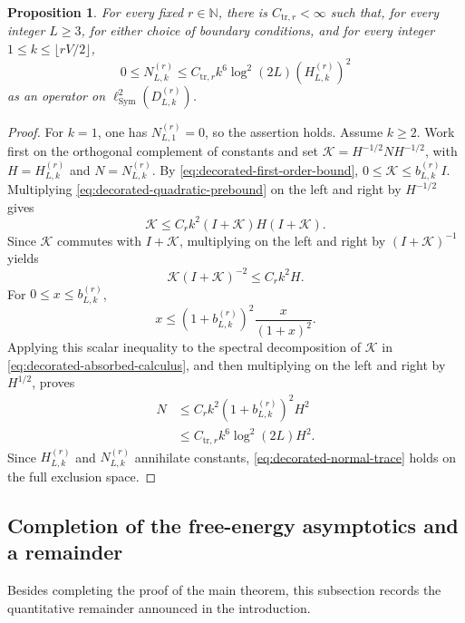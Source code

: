 \documentclass[11pt]{article}
\numberwithin{equation}{section}
\newtheorem{proposition}[theorem]{Proposition}
\theoremstyle{remark}
\newcommand{\1}{\mathbf 1}
\begin{document}
\begin{proposition}
\label{prop:decorated-normal-trace}
For every fixed \(r\in\mathbb N\), there is \(C_{\mathrm{tr},r}<\infty\)
such that, for every integer \(L\geq3\), for either choice of boundary
conditions, and for every integer
\(1\leq k\leq\lfloor rV/2\rfloor\),
\begin{equation}
 0\leq N_{L,k}^{(r)}
 \leq C_{\mathrm{tr},r}k^6\log^2(2L)
 (H_{L,k}^{(r)})^2
 \label{eq:decorated-normal-trace}
\end{equation}
as an operator on \(\ell^2_{\mathrm{Sym}}(D_{L,k}^{(r)})\).
\end{proposition}

\begin{proof}
For \(k=1\), one has \(N_{L,1}^{(r)}=0\), so the assertion holds.  Assume
\(k\geq2\).
Work first on the orthogonal complement of constants and set
\(\mathcal K=H^{-1/2}NH^{-1/2}\), with
\(H=H_{L,k}^{(r)}\) and \(N=N_{L,k}^{(r)}\).  By
\eqref{eq:decorated-first-order-bound},
\(0\leq\mathcal K\leq b_{L,k}^{(r)}I\).  Multiplying
\eqref{eq:decorated-quadratic-prebound} on the left and right by
\(H^{-1/2}\) gives
\[
 \mathcal K\leq C_rk^2(I+\mathcal K)H(I+\mathcal K).
\]
Since \(\mathcal K\) commutes with \(I+\mathcal K\), multiplying on the
left and right by \((I+\mathcal K)^{-1}\) yields
\begin{equation}
 \mathcal K(I+\mathcal K)^{-2}\leq C_rk^2H.
 \label{eq:decorated-absorbed-calculus}
\end{equation}
For \(0\leq x\leq b_{L,k}^{(r)}\),
\[
 x\leq(1+b_{L,k}^{(r)})^2\frac{x}{(1+x)^2}.
\]
Applying this scalar inequality to the spectral decomposition of
\(\mathcal K\) in \eqref{eq:decorated-absorbed-calculus}, and then
multiplying on the left and right by \(H^{1/2}\), proves
\begin{align*}
 N&\leq C_rk^2(1+b_{L,k}^{(r)})^2H^2\\
  &\leq C_{\mathrm{tr},r}k^6\log^2(2L)H^2.
\end{align*}
Since \(H_{L,k}^{(r)}\) and \(N_{L,k}^{(r)}\) annihilate constants,
\eqref{eq:decorated-normal-trace} holds on the full exclusion space.
\end{proof}

\subsection{Completion of the free-energy asymptotics and a remainder}
\label{subsec:completion-fixed-spin}

Besides completing the proof of the main theorem, this subsection records
the quantitative remainder announced in the introduction.
\end{document}
